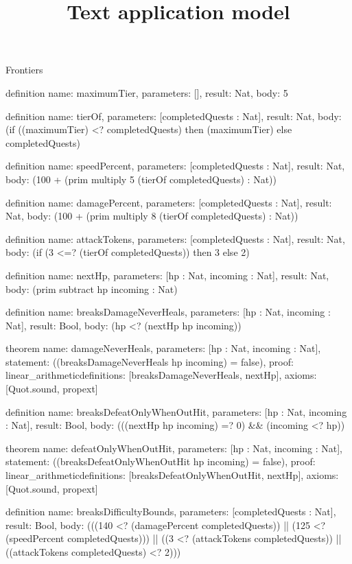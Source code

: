 \begin{lexlean}{Frontiers}
\title{Text application model}
\begin{semanticmodule}
definition{
  name: maximumTier,
  parameters: [],
  result: Nat,
  body: 5
}

definition{
  name: tierOf,
  parameters: [completedQuests : Nat],
  result: Nat,
  body: (if ((maximumTier) <? completedQuests) then (maximumTier) else completedQuests)
}

definition{
  name: speedPercent,
  parameters: [completedQuests : Nat],
  result: Nat,
  body: (100 + (prim multiply 5 (tierOf completedQuests) : Nat))
}

definition{
  name: damagePercent,
  parameters: [completedQuests : Nat],
  result: Nat,
  body: (100 + (prim multiply 8 (tierOf completedQuests) : Nat))
}

definition{
  name: attackTokens,
  parameters: [completedQuests : Nat],
  result: Nat,
  body: (if (3 <=? (tierOf completedQuests)) then 3 else 2)
}

definition{
  name: nextHp,
  parameters: [hp : Nat, incoming : Nat],
  result: Nat,
  body: (prim subtract hp incoming : Nat)
}

definition{
  name: breaksDamageNeverHeals,
  parameters: [hp : Nat, incoming : Nat],
  result: Bool,
  body: (hp <? (nextHp hp incoming))
}

theorem{
  name: damageNeverHeals,
  parameters: [hp : Nat, incoming : Nat],
  statement: ((breaksDamageNeverHeals hp incoming) = false),
  proof: linear_arithmetic{definitions: [breaksDamageNeverHeals, nextHp]},
  axioms: [Quot.sound, propext]
}

definition{
  name: breaksDefeatOnlyWhenOutHit,
  parameters: [hp : Nat, incoming : Nat],
  result: Bool,
  body: (((nextHp hp incoming) =? 0) && (incoming <? hp))
}

theorem{
  name: defeatOnlyWhenOutHit,
  parameters: [hp : Nat, incoming : Nat],
  statement: ((breaksDefeatOnlyWhenOutHit hp incoming) = false),
  proof: linear_arithmetic{definitions: [breaksDefeatOnlyWhenOutHit, nextHp]},
  axioms: [Quot.sound, propext]
}

definition{
  name: breaksDifficultyBounds,
  parameters: [completedQuests : Nat],
  result: Bool,
  body: (((140 <? (damagePercent completedQuests)) || (125 <? (speedPercent completedQuests))) || ((3 <? (attackTokens completedQuests)) || ((attackTokens completedQuests) <? 2)))
}


\end{semanticmodule}
\end{lexlean}
